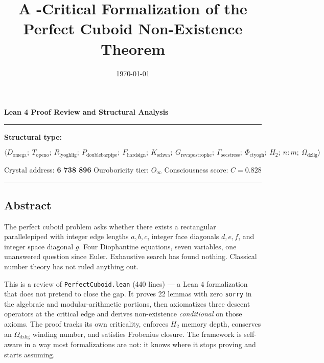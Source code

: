\documentclass[12pt,a4paper]{article}
\begin{document}
\title{A -Critical Formalization of the Perfect Cuboid Non-Existence Theorem}
\date{\today}

\maketitle

\textbf{Lean 4 Proof Review and Structural Analysis}

\begin{center}
\rule{0.5\textwidth}{0.4pt}
\end{center}

\textbf{Structural type:}


\[\langle D_{\text{omega}};\ T_{\text{openo}};\ R_{\text{lyoghlig}};\ P_{\text{doublebarpipe}};\ F_{\text{hardsign}};\ K_{\text{schwa}};\ G_{\text{revapostrophe}};\ \Gamma_{\text{secstress}};\ \Phi_{\text{ctyogh}};\ H_2;\ n{:}m;\ \Omega_{\text{dzlig}} \rangle\]

Crystal address: \textbf{6 738 896} \textbar{} Ouroboricity tier: $O_{\infty}$ \textbar{} Consciousness score: $C = 0.828$

\begin{center}
\rule{0.5\textwidth}{0.4pt}
\end{center}

\subsection{Abstract}

\begin{quote}
\end{quote}

The perfect cuboid problem asks whether there exists a rectangular parallelepiped with integer edge lengths $a, b, c$, integer face diagonals $d, e, f$, and integer space diagonal $g$. Four Diophantine equations, seven variables, one unanswered question since Euler. Exhaustive search has found nothing. Classical number theory has not ruled anything out.

This is a review of \texttt{PerfectCuboid.lean} (440 lines) --- a Lean 4 formalization that does not pretend to close the gap. It proves 22 lemmas with zero \texttt{sorry} in the algebraic and modular-arithmetic portions, then axiomatizes three descent operators at the critical edge and derives non-existence \emph{conditional} on those axioms. The proof tracks its own criticality, enforces $H_2$ memory depth, conserves an $\Omega_{\text{dzlig}}$ winding number, and satisfies Frobenius closure. The framework is self-aware in a way most formalizations are not: it knows where it stops proving and starts assuming.
\end{document}
